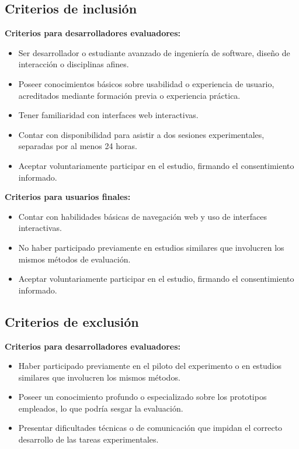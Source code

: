 \documentclass[a4paper,12pt]{report}
\begin{document}
\subsection*{Criterios de inclusión}
\textbf{Criterios para desarrolladores evaluadores:}
\begin{itemize}
    \item Ser desarrollador o estudiante avanzado de ingeniería de software, diseño de interacción o disciplinas afines.
    \item Poseer conocimientos básicos sobre usabilidad o experiencia de usuario, acreditados mediante formación previa o experiencia práctica.
    \item Tener familiaridad con interfaces web interactivas.
    \item Contar con disponibilidad para asistir a dos sesiones experimentales, separadas por al menos 24 horas.
    \item Aceptar voluntariamente participar en el estudio, firmando el consentimiento informado.
\end{itemize}

\textbf{Criterios para usuarios finales:}
\begin{itemize}
    \item Contar con habilidades básicas de navegación web y uso de interfaces interactivas.
    \item No haber participado previamente en estudios similares que involucren los mismos métodos de evaluación.
    \item Aceptar voluntariamente participar en el estudio, firmando el consentimiento informado.
\end{itemize}

\subsection*{Criterios de exclusión}
\textbf{Criterios para desarrolladores evaluadores:}
\begin{itemize}
    \item Haber participado previamente en el piloto del experimento o en estudios similares que involucren los mismos métodos.
    \item Poseer un conocimiento profundo o especializado sobre los prototipos empleados, lo que podría sesgar la evaluación.
    \item Presentar dificultades técnicas o de comunicación que impidan el correcto desarrollo de las tareas experimentales.
\end{itemize}
\end{document}
